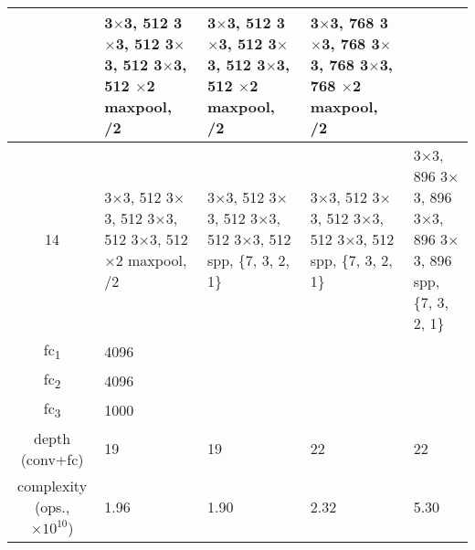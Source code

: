 \begin{table}
\begin{threeparttable}
\begin{tabular}{cllll}
              & \makecell[l]{3$\times$3, 512 \\ 3$\times$3, 512 \\ 3$\times$3, 512 \\ 3$\times$3, 512 \\ \addlinespace 2$\times$2 maxpool, /2}
              & \makecell[l]{3$\times$3, 512 \\ 3$\times$3, 512 \\ 3$\times$3, 512 \\ 3$\times$3, 512 \\ \addlinespace 2$\times$2 maxpool, /2}
              & \makecell[l]{3$\times$3, 768 \\ 3$\times$3, 768 \\ 3$\times$3, 768 \\ 3$\times$3, 768 \\ \addlinespace 2$\times$2 maxpool, /2} \\
            \midrule
            14
              & \makecell[l]{3$\times$3, 512 \\ 3$\times$3, 512 \\ 3$\times$3, 512 \\ 3$\times$3, 512 \\ \addlinespace 2$\times$2 maxpool, /2}
              & \makecell[l]{3$\times$3, 512 \\ 3$\times$3, 512 \\ 3$\times$3, 512 \\ 3$\times$3, 512 \\ \addlinespace spp, \{7, 3, 2, 1\}}
              & \makecell[l]{3$\times$3, 512 \\ 3$\times$3, 512 \\ 3$\times$3, 512 \\ 3$\times$3, 512 \\ \addlinespace spp, \{7, 3, 2, 1\}}
              & \makecell[l]{3$\times$3, 896 \\ 3$\times$3, 896 \\ 3$\times$3, 896 \\ 3$\times$3, 896 \\ \addlinespace spp, \{7, 3, 2, 1\}} \\
            \midrule
            fc\textsubscript{1} & \multicolumn{4}{l}{4096} \\
            fc\textsubscript{2} & \multicolumn{4}{l}{4096} \\
            fc\textsubscript{3} & \multicolumn{4}{l}{1000} \\
            \midrule
            depth (conv+fc) & 19 & 19 & 22 & 22 \\
            complexity (ops., $\times 10^{10}$) & 1.96 & 1.90 & 2.32 & 5.30 \\
            \bottomrule
        \end{tabular}
        

\end{threeparttable}
\end{table}
